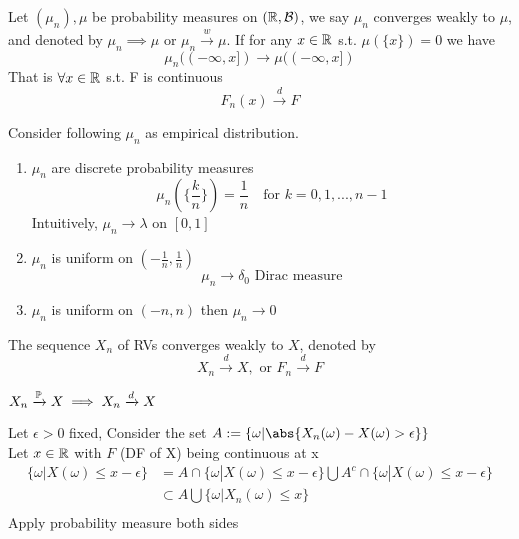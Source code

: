 \begin{dfn}
Let $(\mu_n), \mu$ be probability measures on $(\mathbb{R}, \mathcal{B})$, we say $\mu_n$ converges weakly to $\mu$, and denoted by $\mu_n \implies\mu$ or $\mu_n \xrightarrow{w}\mu$. If for any $x\in \mathbb{R}$ s.t. $\mu(\{x\}) = 0$ we have 
\begin{equation*}
\mu_n((-\infty,x]) \rightarrow \mu((-\infty,x]) 
\end{equation*}That is $\forall x\in \mathbb{R} $ s.t. F is continuous 
\begin{equation*}
    F_n(x) \xrightarrow{d} F
\end{equation*}
\end{dfn}
\begin{example} 
Consider following $\mu_n$ as empirical distribution.
\begin{enumerate}
    \item $\mu_n$  are discrete probability measures 
    \begin{equation*}
        \mu_n(\{\frac{k}{n}\}) = \frac{1}{n} \quad \text{for } k= 0,1,...,n-1
    \end{equation*}Intuitively, $\mu_n \rightarrow \lambda$ on $[0,1]$
    \item $\mu_n$ is uniform on $(-\frac{1}{n}, \frac{1}{n})$
    \begin{equation*}
        \mu_n \rightarrow \delta_0 \text{ Dirac measure}
    \end{equation*}
    \item $\mu_n$ is uniform on $(-n, n)$ then $ \mu_n \rightarrow 0$
\end{enumerate}
\end{example}
\pf 
\newpage
\begin{dfn} The sequence $X_n$ of RVs converges weakly to $X$, denoted by 
\begin{equation*}
    X_n \xrightarrow{d} X, \text{ or } F_n \xrightarrow{d} F
\end{equation*}
\end{dfn}
\begin{prop}\label{pimplyd}
$X_n \xrightarrow{\mathbb{P}} X \implies X_n \xrightarrow{d} X$
\end{prop}
\pf Let $\epsilon >0$ fixed, Consider the set $A := \{\omega| \abs{X_n(\omega) - X(\omega) > \epsilon}\}$ \\
Let $x\in \mathbb{R}$ with $F$ (DF of X) being continuous at x
\begin{align*}
    \{\omega| X(\omega) \leq x-\epsilon\} &= A\cap \{\omega| X(\omega) \leq x-\epsilon\} \bigcup A^c \cap \{\omega| X(\omega) \leq x-\epsilon\} \\
    &\subset A \bigcup \{\omega|X_n(\omega) \leq x\} \\
\end{align*} Apply probability measure both sides
